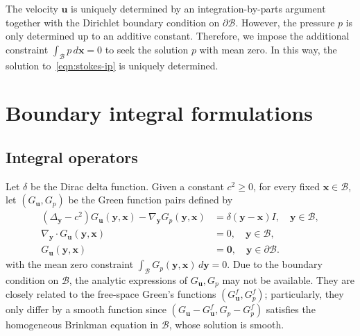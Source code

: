 \documentclass[preprint,11pt]{elsarticle}
\theoremstyle{remark}
\newcommand{\mb}[1]{\mathbf{#1}}
\newcommand{\mc}[1]{\mathcal{#1}}
\newcommand{\bm}[1]{\boldsymbol{#1}}
\begin{document}
The velocity $\bm u$ is uniquely determined by an integration-by-parts argument together with the Dirichlet boundary condition on $\partial\mc B$. However, the pressure $p$ is only determined up to an additive constant. Therefore, we impose the additional constraint
$\int_{\mc B} p\,d\bm x = 0$
to seek the solution $p$ with mean zero. 
In this way, the solution to~\eqref{eqn:stokes-ip} is uniquely determined.

\section{Boundary integral formulations}\label{sec3}
\subsection{Integral operators}
Let $\delta$ be the Dirac delta function. Given a constant $c^2 \geq 0$, for every fixed $\bm x \in\mathcal{B}$, let $(G_{\bm u }, G_p)$ be the Green function pairs defined by
\begin{equation}
\begin{aligned}
    (\Delta_{\bm y} - c^2) G_{\bm u }(\bm y , \bm x ) - \nabla_{\bm y} G_p(\bm y , \bm x ) &= \delta(\bm y - \bm x )  I , \quad \bm y \in\mathcal{B},\\
    \nabla_{\bm y} \cdot G_{\bm u }(\bm y , \bm x ) &= 0,  \quad \bm y \in \mathcal{B}, \\
    G_{\bm u}(\bm y, \bm x) & = \bm 0,  \quad \bm y \in \partial\mathcal{B}.
\end{aligned}
\end{equation}
with the mean zero constraint $\int_{\mc B} G_p (\mb y,\bm x)\,d\bm y = 0$.
Due to the boundary condition on $\mc B$, the analytic expressions of $G_{\bm u}, G_p$ may not be available. They are closely related to the free-space Green's functions $(G_{\bm u}^f, G_p^f)$; particularly, they only differ by a smooth function since $(G_{\bm u}-G_{\bm u}^f, G_p - G_p^f)$ satisfies the homogeneous Brinkman equation in $\mc B$, whose solution is smooth.
\end{document}
